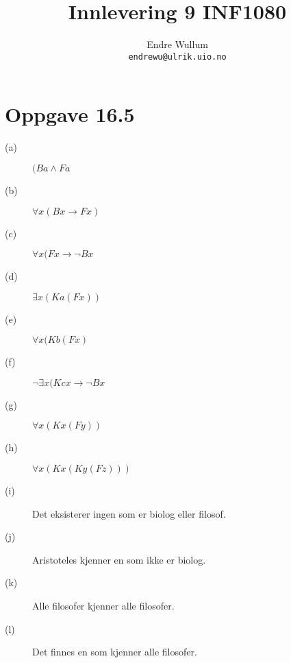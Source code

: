 \documentclass[12pt,norsk,a4paper]{article}
\title{Innlevering 9 INF1080}
\author{Endre Wullum\\ \texttt{endrewu@ulrik.uio.no}}
\begin{document}
\maketitle

\section*{Oppgave 16.5}
\begin{description}
\item[(a)]$(Ba \land Fa$
\item[(b)]$\forall x(Bx \rightarrow Fx)$
\item[(c)]$\forall x(Fx \rightarrow \neg Bx$
\item[(d)]$\exists x(Ka(Fx))$
\item[(e)]$\forall x(Kb(Fx)$
\item[(f)]$\neg \exists x(Kcx \rightarrow \neg Bx$
\item[(g)]$\forall x(Kx(Fy))$
\item[(h)]$\forall x(Kx(Ky(Fz)))$
\item[(i)]Det eksisterer ingen som er biolog eller filosof.
\item[(j)]Aristoteles kjenner en som ikke er biolog.
\item[(k)]Alle filosofer kjenner alle filosofer.
\item[(l)]Det finnes en som kjenner alle filosofer.
\end{description}


\end{document}
